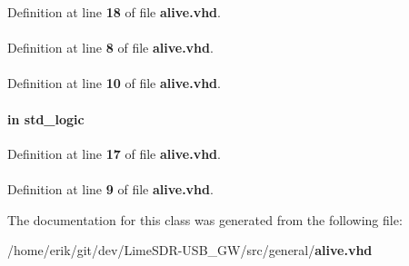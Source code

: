 Definition at line {\bf 18} of file {\bf alive.\+vhd}.

\paragraph[{ieee}]{\hspace{0.3cm}{\ttfamily [Library]}}\label{classalive_a0a6af6eef40212dbaf130d57ce711256}


Definition at line {\bf 8} of file {\bf alive.\+vhd}.

\paragraph[{numeric\+\_\+std}]{\hspace{0.3cm}{\ttfamily [Package]}}\label{classalive_a2edc34402b573437d5f25fa90ba4013e}


Definition at line {\bf 10} of file {\bf alive.\+vhd}.

\paragraph[{rst}]{ {\bfseries \textcolor{keywordflow}{in}\textcolor{vhdlchar}{ }} {\bfseries \textcolor{comment}{std\+\_\+logic}\textcolor{vhdlchar}{ }} \hspace{0.3cm}{\ttfamily [Port]}}\label{classalive_ae0366c76519a377d49a533f4eff582ad}


Definition at line {\bf 17} of file {\bf alive.\+vhd}.

\paragraph[{std\+\_\+logic\+\_\+1164}]{\hspace{0.3cm}{\ttfamily [Package]}}\label{classalive_acd03516902501cd1c7296a98e22c6fcb}


Definition at line {\bf 9} of file {\bf alive.\+vhd}.



The documentation for this class was generated from the following file\+:\begin{DoxyCompactItemize}
\item 
/home/erik/git/dev/\+Lime\+S\+D\+R-\/\+U\+S\+B\+\_\+\+G\+W/src/general/{\bf alive.\+vhd}\end{DoxyCompactItemize}
